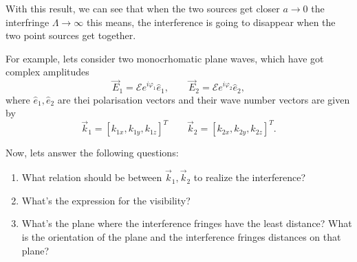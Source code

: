         With this result, we can see that when the two sources get closer $a \to 0$ the interfringe $\Lambda \to \infty$ this means, the interference is going to disappear when the two point sources get together.

        For example, lets consider two monocrhomatic plane waves, which have got complex amplitudes
        \begin{equation}
            \vec{E}_1 = \mathcal{E}e^{i\varphi_1}\hat{e}_1, \qquad \vec{E}_2 = \mathcal{E}e^{i\varphi_2}\hat{e}_2,
        \end{equation}
        where $\hat{e}_1,\hat{e}_2$ are thei polarisation vectors and their wave number vectors are given by
        \begin{equation}
            \vec{k}_1 = \left[k_{1x}, k_{1y}, k_{1z} \right]^T \qquad \vec{k}_2 = \left[k_{2x}, k_{2y}, k_{2z} \right]^T.
        \end{equation}

        Now, lets answer the following questions:

        \begin{enumerate}
            \item What relation should be between $\vec{k}_1,\vec{k}_2$ to realize the interference?
            \item What's the expression for the visibility?
            \item What's the plane where the interference fringes have the least distance? What is the orientation of the plane and the interference fringes distances on that plane?
        \end{enumerate}

